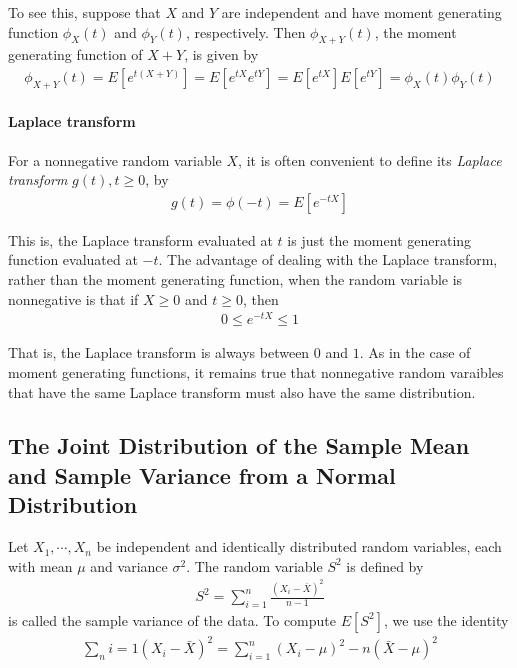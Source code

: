 \documentclass[10 pt,final]{article}
\newcommand{\impo}[1]{{\color{magenta} #1}}
\begin{document}
To see this, suppose that $X$ and $Y$ are independent and have moment generating function $\phi_X(t)$ and $\phi_Y(t)$, respectively. Then $\phi_{X+Y}(t)$, the moment generating function of $X+Y$, is given by
\begin{align*}
\phi_{X+Y}(t) = E[e^{t(X+Y)}] = E[e^{tX} e^{tY}] = E[e^{tX}] E[e^{tY}] = \phi_X(t) \phi_Y(t)
\end{align*}


\paragraph{\impo{Laplace transform}} For a nonnegative random variable $X$, it is often convenient to define its \emph{Laplace transform} $g(t), t \geq 0$, by
\begin{align*}
g(t) = \phi(-t) = E[e^{-tX}] 
\end{align*}

This is, the Laplace transform evaluated at $t$ is just the moment generating function evaluated at $-t$. The \impo{advantage} of dealing with the Laplace transform, rather than the moment generating function, when the random variable is nonnegative is that if $X \geq 0$ and $t \geq 0$, then
\impo{
\begin{align*}
0 \leq e^{-tX} \leq 1
\end{align*}
}

That is, the Laplace transform is always between $0$ and $1$. As in the case of moment generating functions, it remains true that nonnegative random varaibles that have \impo{the same Laplace transform must also have the same distribution}.


\subsection{The Joint Distribution of the Sample Mean and Sample Variance from a Normal Distribution}
Let $X_1, \cdots, X_n$ be independent and identically distributed random variables, each with mean $\mu$ and variance $\sigma^2$. The random variable $S^2$ is defined by
\begin{align*}
S^2 = \sum^n_{i=1} \frac{(X_i - \bar{X})^2}{n-1}
\end{align*}
is called the \impo{sample variance} of the data. To compute $E[S^2]$, we use the identity
\begin{align*}
\sum_n{i=1} (X_i - \bar{X})^2 = \sum^n_{i=1} (X_i - \mu)^2 - n(\bar{X} - \mu)^2
\end{align*}
\end{document}
